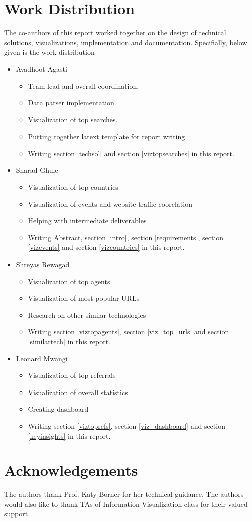 \documentclass[sigconf]{acmart}
\begin{document}
\section{Work Distribution}
The co-authors of this report worked together on the design of technical
solutions, visualizations, implementation and documentation. Specifially,
below given is the work distribution
\begin{itemize}
\item Avadhoot Agasti
    \begin{itemize}
    \item Team lead and overall coordination.
    \item Data parser implementation.
    \item Visualization of top searches.
    \item Putting together latext template for report writing.
    \item Writing section \ref{techsol} and section \ref{viztopsearches}
     in this
    report.
    \end{itemize}

\item Sharad Ghule
    \begin{itemize}
    \item Visualization of top countries
    \item Visualization of events and website traffic coorelation
    \item Helping with intermediate deliverables
    \item Writing Abstract, section \ref{intro}, section \ref{requirements},
    section \ref{vizevents} and
    section \ref{vizcountries}  in this report.
    \end{itemize}

\item Shreyas Rewagad
    \begin{itemize}
    \item Visualization of top agents
    \item Visualization of most popular URLs
    \item Research on other similar technologies
    \item Writing section \ref{viztopagents}, section \ref{viz_top_urls} and
    section \ref{similartech}  in this report.
    \end{itemize}

\item Leonard Mwangi
    \begin{itemize}
    \item Visualization of top referrals
    \item Visualization of overall statistics
    \item Creating dashboard
    \item Writing section \ref{viztoprefs}, section \ref{viz_dashboard} and
    section \ref{keyinsights} in this report.
    \end{itemize}

\end{itemize}


\section{Acknowledgements}
 The authors thank Prof. Katy Borner for her technical guidance. The
 authors would also like to thank TAs of Information Visualization class for their valued
 support.



 
\end{document}
